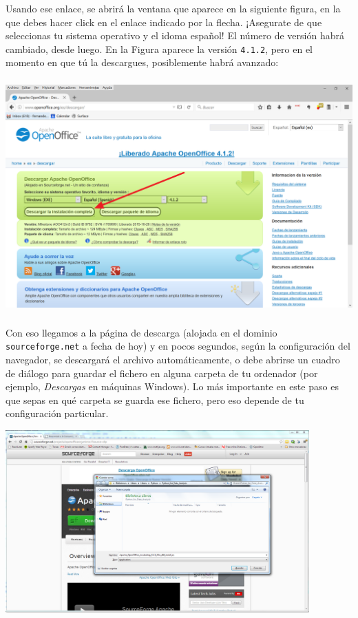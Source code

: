 \documentclass[10pt,a4paper]{article}
\begin{document}
Usando ese enlace, se abrirá la ventana que aparece en la siguiente figura, en la que debes hacer
click en el enlace indicado por la flecha. ¡Asegurate de que seleccionas tu sistema operativo y el idoma español! El número de versión habrá cambiado, desde luego. En la
Figura aparece la versión {\tt 4.1.2}, pero en el momento en que tú la descargues, posiblemente habrá avanzado:
    \begin{center}
    \includegraphics[height=9cm]{../fig/Tut00-WebOpenOffice-02-201605.png}
    \end{center}

Con eso llegamos a la página de descarga (alojada en el dominio {\tt sourceforge.net} a fecha de
hoy) y en pocos segundos, según la configuración del navegador, se descargará el archivo
automáticamente, o debe abrirse un cuadro de diálogo para guardar el fichero en alguna carpeta de
tu ordenador (por ejemplo, {\em Descargas} en máquinas Windows). Lo más importante en este paso es
que sepas en qué carpeta se guarda ese fichero, pero eso depende de tu configuración particular.

    \begin{center}
    \includegraphics[height=7cm]{../fig/Tut00-WebOpenOffice-02.png}
    \end{center}
\end{document}
